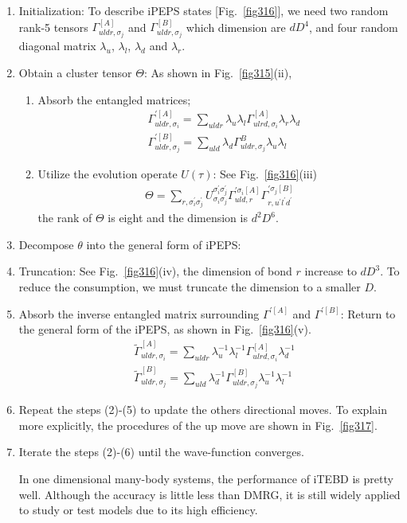 \begin{enumerate}
	\item Initialization: To describe iPEPS states [Fig.~\ref{fig316}], we need two random rank-5 tensors $\Gamma^{[A]}_{uldr,\sigma_j}$ and $\Gamma^{[B]}_{uldr, \sigma_j}$ which dimension are $dD^4$, and four random diagonal matrix $\lambda_{u}$, $\lambda_{l}$, $\lambda_{d}$ and $\lambda_{r}$.
	\item Obtain a cluster tensor $\Theta$: As shown in Fig.~\ref{fig315}(ii),
		\begin{enumerate}
			\item Absorb the entangled matrices; 
				\begin{align}
					&\Gamma^{\prime [A]}_{uldr,\sigma_i} = \sum_{uldr}{ \lambda_{u}\lambda_{l} \Gamma^{[A]}_{ulrd,\sigma_i} \lambda_{r} \lambda_{d}} \\
					&\Gamma^{\prime [B]}_{uldr,\sigma_j} = \sum_{uld}{\lambda_{d} \Gamma^{B}_{uldr,\sigma_j} \lambda_{u}\lambda_{l}}
				\end{align}
			\item Utilize the evolution operate $U(\tau)$: See Fig.~\ref{fig316}(iii)
				\begin{align}
					\Theta = \sum_{r,\sigma_i^{\prime}\sigma_j^{\prime}}{U^{\sigma_i^{\prime}\sigma_j^{\prime}}_{\sigma_i\sigma_j} \Gamma^{\prime\sigma_i [A]}_{uld,r} \Gamma^{\prime \sigma_j[B]}_{r,u^{\prime} l^{\prime} d^{\prime}}}
				\end{align}
				the rank of $\Theta$ is eight and the dimension is $d^2D^6$.
			\end{enumerate}
		\item Decompose $\theta$ into the general form of iPEPS:
		\item Truncation: See Fig.~\ref{fig316}(iv), the dimension of bond $r$ increase to $dD^3$. To reduce the consumption, we must truncate the dimension to a smaller $D$.
		\item Absorb the inverse entangled matrix surrounding $\Gamma^{\prime [A]}$ and $\Gamma^{\prime [B]}$: Return to the general form of the iPEPS, as shown in Fig.~\ref{fig316}(v).
				\begin{align}
					&\widetilde{\Gamma}^{[A]}_{uldr,\sigma_i} = \sum_{uldr}{ \lambda_{u}^{-1} \lambda_{l}^{-1} \Gamma^{[A]}_{ulrd,\sigma_i} \lambda_{d}^{-1}} \\
					&\widetilde{\Gamma}^{[B]}_{uldr,\sigma_j} = \sum_{uld}{\lambda_{d}^{-1} \Gamma^{[B]}_{uldr,\sigma_j} \lambda_{u}^{-1} \lambda_{l}^{-1}}
				\end{align}
			\item Repeat the steps (2)-(5) to update the others directional moves. To explain more explicitly, the procedures of the up move are shown in Fig.~\ref{fig317}.
			\item Iterate the steps (2)-(6) until the wave-function converges.
			
In one dimensional many-body systems, the performance of iTEBD is pretty well. Although the accuracy is little less than DMRG, it is still widely applied to study or test models due to its high efficiency.

\end{enumerate}

